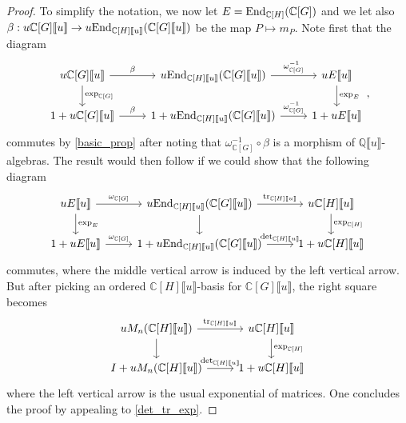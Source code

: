 \documentclass[11pt]{amsart}
\numberwithin{equation}{section}
\theoremstyle{remark}
\theoremstyle{definition}
\begin{document}
\begin{proof}
To simplify the notation, we now let $E = {\rm End}_{\mathbb{C}[H]}(\mathbb{C}[G])$ and we let also $\beta:u\mathbb{C}[G]\llbracket u \rrbracket \rightarrow u{\rm End}_{\mathbb{C}[H]\llbracket u \rrbracket}(\mathbb{C}[G]\llbracket u \rrbracket)$ be the map $P \mapsto m_{P}$.  Note first that the diagram
\begin{equation*}
\begin{tikzcd}
u\mathbb{C}[G]\llbracket u \rrbracket \arrow["{\rm exp}_{\mathbb{C}[G]}",d] \arrow["\beta",r] & u{\rm End}_{\mathbb{C}[H]\llbracket u \rrbracket}(\mathbb{C}[G]\llbracket u \rrbracket)  \arrow["\omega_{\mathbb{C}[G]}^{-1}",r] & uE\llbracket u \rrbracket \arrow["{\rm exp}_{E}",d]\\
1+u\mathbb{C}[G]\llbracket u \rrbracket\arrow["\beta",r] & 1+u{\rm End}_{\mathbb{C}[H]\llbracket u \rrbracket}(\mathbb{C}[G]\llbracket u \rrbracket) \arrow["\omega_{\mathbb{C}[G]}^{-1}",r] & 1+uE\llbracket u \rrbracket
\end{tikzcd},
\end{equation*}
commutes by \cref{basic_prop} after noting that $\omega_{\mathbb{C}[G]}^{-1} \circ \beta$ is a morphism of $\mathbb{Q}\llbracket u \rrbracket$-algebras.  The result would then follow if we could show that the following diagram
\begin{equation*}
\begin{tikzcd}
uE\llbracket u \rrbracket \arrow["{\rm exp}_{E}",d] \arrow["\omega_{\mathbb{C}[G]}",r] & u{\rm End}_{\mathbb{C}[H]\llbracket u \rrbracket}(\mathbb{C}[G]\llbracket u \rrbracket) \arrow[,d] \arrow["{\rm tr}_{\mathbb{C}[H]\llbracket u \rrbracket}",r] & u\mathbb{C}[H] \llbracket u \rrbracket \arrow["{\rm exp}_{\mathbb{C}[H]}",d]\\
1+uE\llbracket u \rrbracket\arrow["\omega_{\mathbb{C}[G]}",r] & 1+u{\rm End}_{\mathbb{C}[H]\llbracket u \rrbracket}(\mathbb{C}[G]\llbracket u \rrbracket) \arrow["{\rm det}_{\mathbb{C}[H]\llbracket u \rrbracket}",r] & 1+ u\mathbb{C}[H] \llbracket u \rrbracket
\end{tikzcd}
\end{equation*}
commutes, where the middle vertical arrow is induced by the left vertical arrow.  But after picking an ordered $\mathbb{C}[H]\llbracket u \rrbracket$-basis for $\mathbb{C}[G]\llbracket u \rrbracket$, the right square becomes
\begin{equation*}
\begin{tikzcd}
uM_{n}(\mathbb{C}[H]\llbracket u \rrbracket) \arrow[,d] \arrow["{\rm tr}_{\mathbb{C}[H]\llbracket u \rrbracket}",r] & u\mathbb{C}[H] \llbracket u \rrbracket \arrow["{\rm exp}_{\mathbb{C}[H]}",d]\\
I+uM_{n}(\mathbb{C}[H]\llbracket u \rrbracket) \arrow["{\rm det}_{\mathbb{C}[H]\llbracket u \rrbracket}",r] & 1+ u\mathbb{C}[H] \llbracket u \rrbracket
\end{tikzcd}
\end{equation*}
where the left vertical arrow is the usual exponential of matrices.  One concludes the proof by appealing to \cref{det_tr_exp}.
\end{proof}
\end{document}
